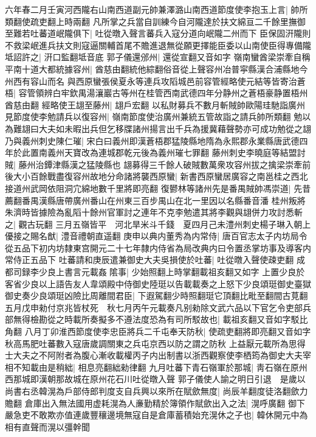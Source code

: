 六年春二月壬寅河西隴右山南西道副元帥兼澤潞山南西道節度使李抱玉上言|{
	帥所類翻使疏吏翻上時兩翻}
凡所掌之兵當自訓練今自河隴達於扶文綿亘二千餘里撫御至難若吐蕃道岷隴俱下|{
	吐從暾入聲言蕃兵入寇分道向岷隴二州而下}
臣保固汧隴則不救梁岷進兵扶文則寇逼關輔首尾不贍進退無從願更擇能臣委以山南使臣得專備隴坻詔許之|{
	汧口監翻坻音底}
郭子儀還邠州|{
	還從宣翻又音如字}
嶺南蠻酋梁崇牽自稱平南十道大都統據容州|{
	酋慈由翻統他綜翻俗音從上聲容州冶普寜縣漢合浦縣地今州西有容山而名}
與西原蠻張侯夏永等連兵攻䧟城邑前容管經略使元結等皆寄治蒼梧|{
	容管領辨白牢欽禺湯瀼巖古等州在桂管西南武德四年分静州之蒼梧豪静置梧州酋慈由翻}
經略使王翃至藤州|{
	翃戶宏翻}
以私財募兵不數月斬賊帥歐陽珪馳詣廣州見節度使李勉請兵以復容州|{
	嶺南節度使治廣州兼統五管故詣之請兵帥所類翻}
勉以為難翃曰大夫如未暇出兵但乞移牒諸州揚言出千兵為援冀藉聲勢亦可成功勉從之翃乃與義州刺史陳仁璀|{
	宋白曰義州即漢蒼梧郡猛陵縣地隋為永熙郡永業縣唐武德四年於此置南義州天寶改為連城郡乾元後為義州璀七罪翻}
藤州刺史李曉庭等結盟討賊|{
	藤州治鐔津縣漢之猛陵縣也}
翃募得三千餘人破賊數萬衆攻容州拔之擒梁崇牽前後大小百餘戰盡復容州故地分命諸將襲西原蠻|{
	新書西原蠻居廣容之南邕桂之西北接道州武岡依阻洞宂綿地數千里將即亮翻}
復鬰林等諸州先是番禺賊帥馮崇道|{
	先昔薦翻番禺漢縣唐帶廣州番山在州東三百步禺山在北一里因以名縣番音潘}
桂州叛將朱濟時皆據險為亂䧟十餘州官軍討之連年不克李勉遣其將李觀與翃併力攻討悉斬之|{
	觀古玩翻}
三月五嶺皆平　河北旱米斗千錢　夏四月己未澧州刺史楊子琳入朝上優接之賜名猷|{
	澧音禮朝直遥翻}
庚申以典内董秀為内常侍|{
	唐百官志太子内坊局令從五品下初内坊隸東宫開元二十七年隸内侍省為局改典内曰令置丞掌坊事及導客内常侍正五品下}
吐蕃請和庚辰遣兼御史大夫吳損使於吐蕃|{
	吐從暾入聲使疎吏翻}
成都司録李少良上書言元載姦隂事|{
	少始照翻上時掌翻載祖亥翻又如字}
上置少良於客省少良以上語告友人韋頌殿中侍御史陸珽以告載載奏之上怒下少良頌珽御史臺獄御史奏少良頌珽凶險比周離間君臣|{
	下遐駕翻少時照翻珽它頂翻比毗至翻間古莧翻}
五月戊申勑付京兆皆杖死　秋七月丙午元載奏凡别勑除文武六品以下官乞令吏部兵部無得檢勘從之時載所奏擬多不遵法度恐為有司所駁故也|{
	載祖亥翻又音如字駁比角翻}
八月丁卯淮西節度使李忠臣將兵二千屯奉天防秋|{
	使疏吏翻將即亮翻又音如字秋高馬肥吐蕃數入寇唐歲調關東之兵屯京西以防之謂之防秋}
上益厭元載所為思得士大夫之不阿附者為腹心漸收載權丙子内出制書以浙西觀察使李栖筠為御史大夫宰相不知載由是稍絀|{
	相息亮翻絀勑律翻}
九月吐蕃下青石嶺軍於那城|{
	靑石嶺在原州西那城即漢朝那故城在原州花石川吐從暾入聲}
郭子儀使人諭之明日引退　是歲以尚書右丞韓滉為戶部侍郎判度支自兵興以來所在賦歛無度|{
	尚辰羊翻度徒洛翻歛力贍翻}
倉庫出入無法國用虚耗滉為人亷勤精於簿領作賦歛出入之法|{
	滉呼廣翻}
御下嚴急吏不敢欺亦值連歲豐穰邊境無寇自是倉庫蓄積始充滉休之子也|{
	韓休開元中為相有直聲而滉以彊幹聞}


